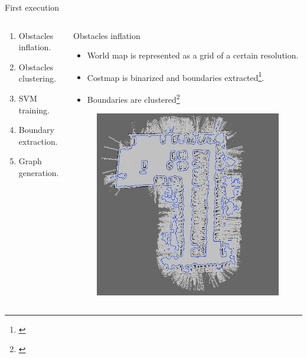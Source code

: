 \begin{frame}{First execution}
  \begin{columns}
    \hskip -0.5cm
    \begin{overlayarea}{\textwidth}{\textheight}
      \begin{enumerate}
	\item<1-> Obstacles inflation.
	\item<1-> Obstacles clustering.
	\item<3-> SVM training.
	\item<4-> Boundary extraction.
	\item<5-> Graph generation.
      \end{enumerate}
    \end{overlayarea}
    \vskip -1cm
    \begin{overlayarea}{\textwidth}{\textheight}
       {
	\begin{block}{Obstacles inflation}
	  \begin{itemize}
	    \item World map is represented as a grid of a certain resolution.
	    \item Costmap is binarized and boundaries extracted\footnote{\cite{suzuki1985topological}}.
	    \item Boundaries are clustered\footnote{\cite{rusu2009semantic}}
	  \end{itemize}
	\end{block}
      }
       {
	\vskip 0.25cm
	\begin{figure}	
	  \includegraphics[height=0.7\textheight]{figure1}

\end{figure}}
\end{overlayarea}
\end{columns}
\end{frame}
